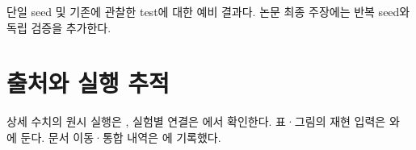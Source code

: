 단일 seed 및 기존에 관찰한 test에 대한 예비 결과다. 논문 최종 주장에는 반복 seed와 독립 검증을 추가한다.



\section*{출처와 실행 추적}

상세 수치의 원시 실행은 , 실험별 연결은 에서 확인한다. 표·그림의 재현 입력은 와 에 둔다. 문서 이동·통합 내역은 에 기록했다.


